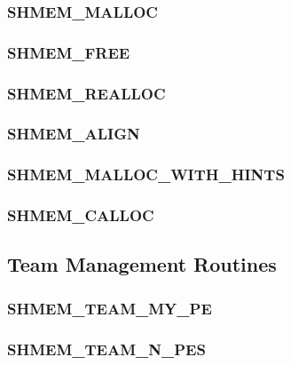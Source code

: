 \documentclass[10pt,oneside]{book}
\begin{document}
\subsubsection{\textbf{SHMEM\_MALLOC}}\label{subsec:shmem_malloc}


\subsubsection{\textbf{SHMEM\_FREE}}\label{subsec:shmem_free}


\subsubsection{\textbf{SHMEM\_REALLOC}}\label{subsec:shmem_realloc}


\subsubsection{\textbf{SHMEM\_ALIGN}}\label{subsec:shmem_align}


\subsubsection{\textbf{SHMEM\_MALLOC\_WITH\_HINTS}}\label{subsec:shmmallochint}


\subsubsection{\textbf{SHMEM\_CALLOC}}\label{subsec:shmem_calloc}





\subsection{Team Management Routines}\label{subsec:team}


\subsubsection{\textbf{SHMEM\_TEAM\_MY\_PE}}\label{subsec:shmem_team_my_pe}


\subsubsection{\textbf{SHMEM\_TEAM\_N\_PES}}\label{subsec:shmem_team_n_pes}

\end{document}

